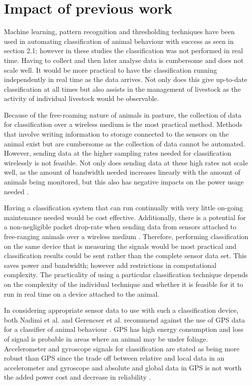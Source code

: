 \section{Impact of previous work}

Machine learning, pattern recognition and thresholding techniques have been used in automating classification of animal behaviour with success as seen in section 2.1; however in these studies the classification was not performed in real time. Having to collect and then later analyse data is cumbersome and does not scale well. It would be more practical to have the classification running independently in real time as the data arrives. Not only does this give up-to-date classification at all times but also assists in the management of livestock as the activity of individual livestock would be observable. 

Because of the free-roaming nature of animals in pasture, the collection of data for classification over a wireless medium is the most practical method. Methods that involve writing information to storage connected to the sensors on the animal exist but are cumbersome as the collection of data cannot be automated. However, sending data at the higher sampling rates needed for classification \cite{Guo2006} \cite{Clapham2011} wirelessly is not feasible. Not only does sending data at these high rates not scale well, as the amount of bandwidth needed increases linearly with the amount of animals being monitored, but this also has negative impacts on the power usage needed \cite{Nadimi2012}. 

Having a classification system that can run continually with very little on-going maintenance needed would be cost effective. Additionally, there is a potential for a non-negligible packet drop-rate when sending data from sensors attached to free-ranging animals over a wireless medium \cite{Nadimi2012}. Therefore, performing classification on the same device that is measuring the signals would be most practical and classification results could be sent rather than the complete sensor data set. This saves power and bandwidth; however add restrictions in computational complexity. The practicality of using a particular classification technique depends on the complexity of the individual technique and whether it is feasible for it to run in real time on a device attached to the animal.

In considering appropriate sensor data to use with such a classification device, both Nadimi et al. and Gerencser et al. recommend against the use of GPS data for a classifier of animal behaviour \cite{Nadimi2012} \cite{Gerencser2013}. GPS has high energy consumption and loss of signal is probable in areas where an animal may be under foliage. Accelerometer and gyroscope signals for classification are stated as being more robust than GPS since the trade off between relative and local data in an accelerometer and gyroscope and absolute and global data in GPS is not worth the added power cost and decrease in reliability \cite{Gerencser2013}.

